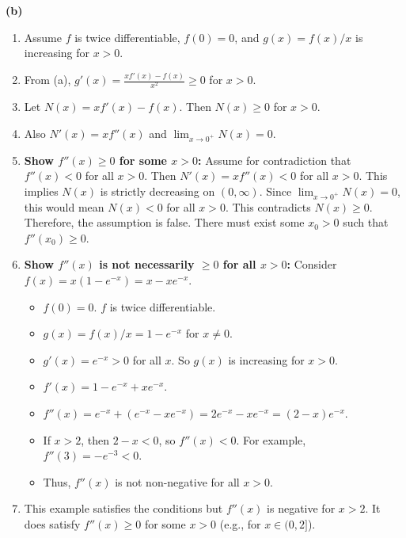 \documentclass{article}
\begin{document}
\textbf{(b)}
\begin{enumerate}
    \item Assume \(f\) is twice differentiable, \(f(0)=0\), and \(g(x)=f(x)/x\) is increasing for \(x>0\).
    \item From (a), \(g'(x) = \frac{x f'(x) - f(x)}{x^2} \ge 0\) for \(x > 0\).
    \item Let \(N(x) = x f'(x) - f(x)\). Then \(N(x) \ge 0\) for \(x > 0\).
    \item Also \(N'(x) = x f''(x)\) and \(\lim_{x \to 0^+} N(x) = 0\).
    \item \textbf{Show \(f''(x) \ge 0\) for some \(x > 0\):}
    Assume for contradiction that \(f''(x) < 0\) for all \(x > 0\).
    Then \(N'(x) = x f''(x) < 0\) for all \(x > 0\).
    This implies \(N(x)\) is strictly decreasing on \((0, \infty)\).
    Since \(\lim_{x \to 0^+} N(x) = 0\), this would mean \(N(x) < 0\) for all \(x > 0\).
    This contradicts \(N(x) \ge 0\).
    Therefore, the assumption is false. There must exist some \(x_0 > 0\) such that \(f''(x_0) \ge 0\).
    \item \textbf{Show \(f''(x)\) is not necessarily \(\ge 0\) for all \(x > 0\):}
    Consider \(f(x) = x(1 - e^{-x}) = x - xe^{-x}\).
    \begin{itemize}
        \item \(f(0) = 0\). \(f\) is twice differentiable.
        \item \(g(x) = f(x)/x = 1 - e^{-x}\) for \(x \ne 0\).
        \item \(g'(x) = e^{-x} > 0\) for all \(x\). So \(g(x)\) is increasing for \(x > 0\).
        \item \(f'(x) = 1 - e^{-x} + xe^{-x}\).
        \item \(f''(x) = e^{-x} + (e^{-x} - xe^{-x}) = 2e^{-x} - xe^{-x} = (2-x)e^{-x}\).
        \item If \(x > 2\), then \(2-x < 0\), so \(f''(x) < 0\). For example, \(f''(3) = -e^{-3} < 0\).
        \item Thus, \(f''(x)\) is not non-negative for all \(x > 0\).
    \end{itemize}
    \item This example satisfies the conditions but \(f''(x)\) is negative for \(x>2\). It does satisfy \(f''(x) \ge 0\) for some \(x > 0\) (e.g., for \(x \in (0, 2]\)).
\end{enumerate}
\end{document}
